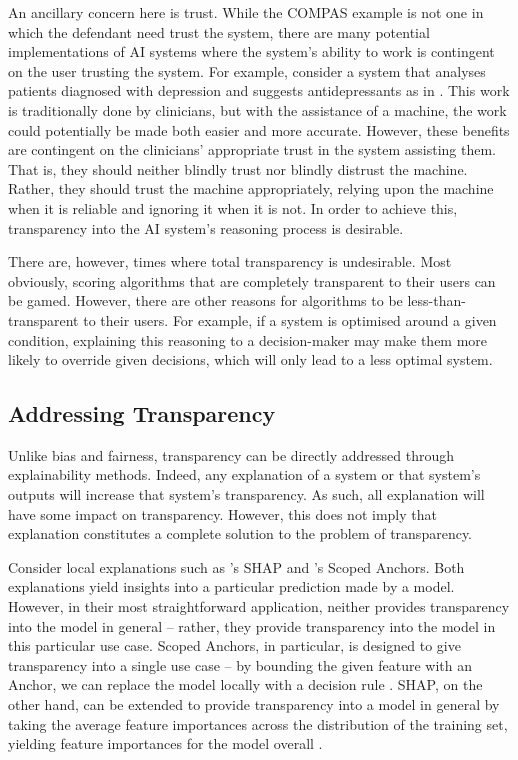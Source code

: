 An ancillary concern here is trust. While the COMPAS example is not one in which the defendant need trust the system, there are many potential implementations of AI systems where the system's ability to work is contingent on the user trusting the system. For example, consider a system that analyses patients diagnosed with depression and suggests antidepressants as in \textcite{jacobs_how_2021}. This work is traditionally done by clinicians, but with the assistance of a machine, the work could potentially be made both easier and more accurate. However, these benefits are contingent on the clinicians' appropriate trust in the system assisting them. That is, they should neither blindly trust nor blindly distrust the machine. Rather, they should trust the machine appropriately, relying upon the machine when it is reliable and ignoring it when it is not. In order to achieve this, transparency into the AI system's reasoning process is desirable.

There are, however, times where total transparency is undesirable. Most obviously, scoring algorithms that are completely transparent to their users can be gamed. However, there are other reasons for algorithms to be less-than-transparent to their users. For example, if a system is optimised around a given condition, explaining this reasoning to a decision-maker may make them more likely to override given decisions, which will only lead to a less optimal system.

\subsection{Addressing Transparency}
Unlike bias and fairness, transparency can be directly addressed through explainability methods. Indeed, any explanation of a system or that system's outputs will increase that system's transparency. As such, all explanation will have some impact on transparency. However, this does not imply that explanation constitutes a complete solution to the problem of transparency. 

Consider local explanations such as \textcite{lundberg_unified_2017}'s SHAP and \textcite{ribeiro_anchors_2018}'s Scoped Anchors. Both explanations yield insights into a particular prediction made by a model. However, in their most straightforward application, neither provides transparency into the model in general – rather, they provide transparency into the model in this particular use case. Scoped Anchors, in particular, is designed to give transparency into a single use case – by bounding the given feature with an Anchor, we can replace the model locally with a decision rule \cite{ribeiro_anchors_2018}. SHAP, on the other hand, can be extended to provide transparency into a model in general by taking the average feature importances across the distribution of the training set, yielding feature importances for the model overall \cite{lundberg_unified_2017}.

